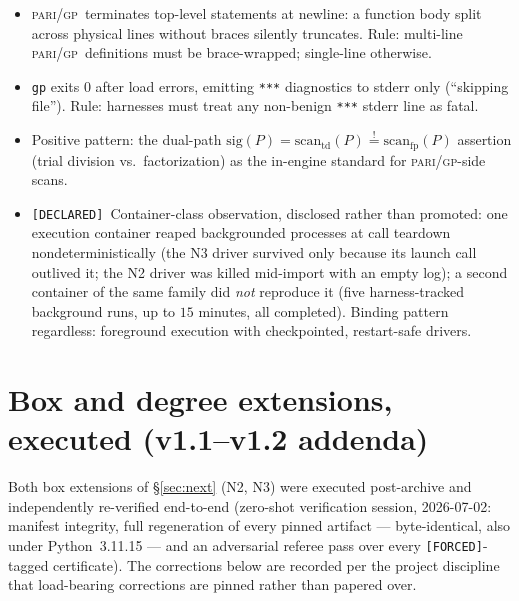 \documentclass[11pt]{article}
\newcommand{\F}{\textnormal{\texttt{[FORCED]}}}
\newcommand{\Dc}{\textnormal{\texttt{[DECLARED]}}}
\newcommand{\gp}{\textsc{pari/gp}}
\theoremstyle{definition}
\begin{document}
\begin{itemize}
\item[\textbf{H1.}] \gp\ terminates top-level statements at newline: a function
body split across physical lines without braces silently truncates. Rule:
multi-line \gp\ definitions must be brace-wrapped; single-line otherwise.
\item[\textbf{H2.}] \texttt{gp} exits $0$ after load errors, emitting
\texttt{***} diagnostics to stderr only (``skipping file''). Rule: harnesses
must treat any non-benign \texttt{***} stderr line as fatal.
\item[\textbf{H3.}] Positive pattern: the dual-path
$\mathrm{sig}(P)=\mathrm{scan}_{\mathrm{td}}(P)\overset{!}{=}\mathrm{scan}_{\mathrm{fp}}(P)$
assertion (trial division vs.\ factorization) as the in-engine standard for
\gp-side scans.
\item[\textbf{H4.}] \Dc\ Container-class observation, disclosed rather than
promoted: one execution container reaped backgrounded processes at call
teardown nondeterministically (the N3 driver survived only because its launch
call outlived it; the N2 driver was killed mid-import with an empty log); a
second container of the same family did \emph{not} reproduce it (five
harness-tracked background runs, up to $15$ minutes, all completed). Binding
pattern regardless: foreground execution with checkpointed, restart-safe
drivers.
\end{itemize}

\section{Box and degree extensions, executed (v1.1--v1.2 addenda)}\label{sec:boxext}

Both box extensions of \S\ref{sec:next} (N2, N3) were executed post-archive
and independently re-verified end-to-end (zero-shot verification session,
2026-07-02: manifest integrity, full regeneration of every pinned artifact ---
byte-identical, also under Python~3.11.15 --- and an adversarial referee pass
over every \F-tagged certificate). The corrections below are recorded per the
project discipline that load-bearing corrections are pinned rather than
papered over.
\end{document}
